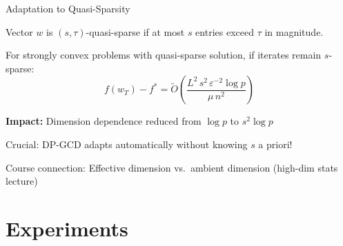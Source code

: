 \documentclass{beamer}
\begin{document}
\begin{frame}{Adaptation to Quasi-Sparsity}
\begin{definition}
Vector $w$ is $(s, \tau)$-quasi-sparse if at most $s$ entries exceed $\tau$ in magnitude.
\end{definition}

\vspace{1em}

\begin{theorem}
For strongly convex problems with quasi-sparse solution, if iterates remain $s$-sparse:
\[
f(w_T) - f^* = \widetilde{O}\!\left( \frac{L^2 \, s^2 \, \varepsilon^{-2} \log p}{\mu \, n^2} \right)
\]
\end{theorem}

\vspace{1em}

\textbf{Impact:} Dimension dependence reduced from $\log p$ to $s^2 \log p$

\vspace{0.5em}

\alert{Crucial:} DP-GCD adapts automatically without knowing $s$ a priori!

\vspace{0.3em}

\alert{Course connection:} Effective dimension vs.\ ambient dimension (high-dim stats lecture)
\end{frame}

\section{Experiments}
\end{document}
